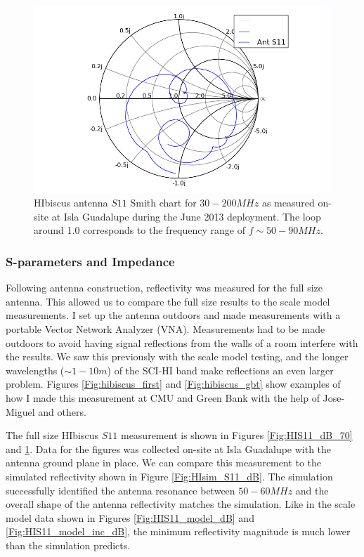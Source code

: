 \begin{figure}[htb]
\centering
\includegraphics[width=0.8\linewidth]{SCIHI_system/figures/HIbiscus_S11_meas_smith.png}
\caption{HIbiscus antenna $S11$ Smith chart for $30-200 MHz$ as measured on-site at Isla Guadalupe during the June 2013 deployment. The loop around 1.0 corresponds to the frequency range of $f \sim 50-90 MHz$. }
\label{Fig:HIS11_Smith_70}
\end{figure}


\subsubsection{S-parameters and Impedance}\label{Sec:HIbiscus_Imp}

Following antenna construction, reflectivity was measured for the full size antenna. This allowed us to compare the full size results to the scale model measurements. I set up the antenna outdoors and made measurements with a portable Vector Network Analyzer (VNA). Measurements had to be made outdoors to avoid having signal reflections from the walls of a room interfere with the results. We saw this previously with the scale model testing, and the longer wavelengths ($\sim 1-10 m$) of the SCI-HI band make reflections an even larger problem. Figures \ref{Fig:hibiscus_first} and \ref{Fig:hibiscus_gbt} show examples of how I made this measurement at CMU and Green Bank with the help of Jose-Miguel and others.

The full size HIbiscus $S11$ measurement is shown in Figures \ref{Fig:HIS11_dB_70} and \ref{Fig:HIS11_Smith_70}. Data for the figures was collected on-site at Isla Guadalupe with the antenna ground plane in place. We can compare this measurement to the simulated reflectivity shown in Figure \ref{Fig:HIsim_S11_dB}. The simulation successfully identified the antenna resonance between $50-60 MHz$ and the overall shape of the antenna reflectivity matches the simulation. Like in the scale model data shown in Figures \ref{Fig:HIS11_model_dB} and \ref{Fig:HIS11_model_inc_dB}, the minimum reflectivity magnitude is much lower than the simulation predicts. 

